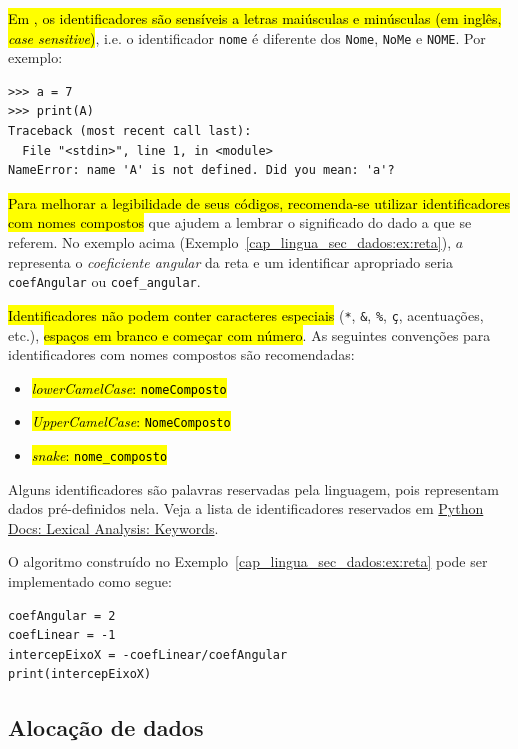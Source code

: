 \hl{Em {\python}, os identificadores são sensíveis a letras maiúsculas e minúsculas (em inglês, \textit{case sensitive})}, i.e. o identificador \lstinline+nome+ é diferente dos \lstinline+Nome+, \lstinline+NoMe+ e \lstinline+NOME+. Por exemplo:
\begin{lstlisting}
>>> a = 7
>>> print(A)
Traceback (most recent call last):
  File "<stdin>", line 1, in <module>
NameError: name 'A' is not defined. Did you mean: 'a'?
\end{lstlisting}

\hl{Para melhorar a legibilidade de seus códigos, recomenda-se utilizar identificadores com nomes compostos} que ajudem a lembrar o significado do dado a que se referem. No exemplo acima (Exemplo~\ref{cap_lingua_sec_dados:ex:reta}), $a$ representa o \emph{coeficiente angular} da reta e um identificar apropriado seria \lstinline+coefAngular+ ou \lstinline+coef_angular+.

\hl{Identificadores não podem conter caracteres especiais} (\lstinline+*+, \lstinline+&+, \lstinline+%+,
\lstinline+ç+, acentuações, etc.), \hl{espaços em branco e começar com número}. As seguintes convenções para identificadores com nomes compostos são recomendadas:
\begin{itemize}
\item \hl{\emph{lowerCamelCase}: {\lstinline+nomeComposto+}}
\item \hl{\emph{UpperCamelCase}: {\lstinline+NomeComposto+}}
\item \hl{\emph{snake}: {\lstinline+nome_composto+}}
\end{itemize}

Alguns identificadores são palavras reservadas pela linguagem, pois representam dados pré-definidos nela. Veja a lista de identificadores reservados em \href{https://docs.python.org/3/reference/lexical_analysis.html#keywords}{Python Docs: Lexical Analysis: Keywords}.

\begin{ex}
  O algoritmo construído no Exemplo~\ref{cap_lingua_sec_dados:ex:reta} pode ser implementado como segue:
\begin{lstlisting}
coefAngular = 2
coefLinear = -1
intercepEixoX = -coefLinear/coefAngular
print(intercepEixoX)
\end{lstlisting}
\end{ex}

\subsection{Alocação de dados}

